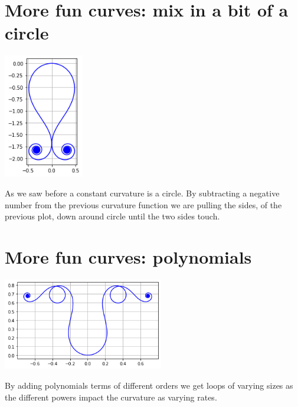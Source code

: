 \documentclass[12pt]{article} %
\theoremstyle{definition}
\theoremstyle{theorem}
\begin{document}
\section{More fun curves: mix in a bit of a circle}
\begin{tcolorbox}
	\begin{minipage}{\linewidth}
		\centering
		\includegraphics[width=35mm, scale=0.2]{s_squared_minus_219.png}
	\end{minipage}
\end{tcolorbox}

As we saw before a constant curvature is a circle. By subtracting a negative number from the previous curvature function we are pulling the sides, of the previous plot, down around circle until the two sides touch.

\section{More fun curves: polynomials}
\begin{tcolorbox}
	\begin{minipage}{\linewidth}
		\centering
		\includegraphics[width=70mm, scale=0.5]{five_s^4.png}
	\end{minipage}
\end{tcolorbox}

By adding polynomials terms of different orders we get loops of varying sizes as the different powers impact the curvature as varying rates.
\end{document}
